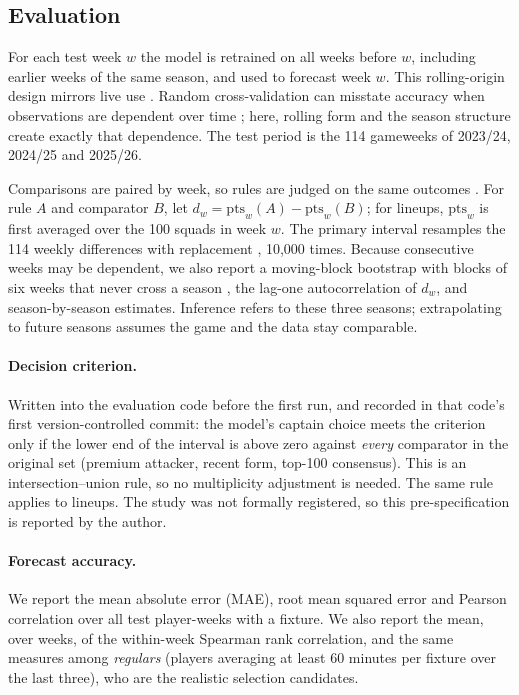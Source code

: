 \documentclass[11pt,a4paper]{article}
\begin{document}
\subsection{Evaluation}
For each test week $w$ the model is retrained on all weeks before $w$, including earlier weeks of
the same season, and used to forecast week $w$. This rolling-origin design mirrors live use
\citep{tashman2000}. Random cross-validation can misstate accuracy when observations are
dependent over time \citep{bergmeir2012}; here, rolling form and the season structure create
exactly that dependence. The test period is the 114 gameweeks of 2023/24, 2024/25 and 2025/26.

Comparisons are paired by week, so rules are judged on the same outcomes
\citep{dieboldmariano1995}. For rule $A$ and comparator $B$, let
$d_w=\mathrm{pts}_w(A)-\mathrm{pts}_w(B)$; for lineups, $\mathrm{pts}_w$ is first averaged over the 100
squads in week $w$. The primary interval resamples the 114 weekly differences with replacement
\citep{efron1993}, 10{,}000 times. Because consecutive weeks may be dependent, we also report a
moving-block bootstrap with blocks of six weeks that never cross a season
\citep{kunsch1989,politis1994}, the lag-one autocorrelation of $d_w$, and season-by-season
estimates. Inference refers to these three seasons; extrapolating to future seasons assumes the
game and the data stay comparable.

\paragraph{Decision criterion.} Written into the evaluation code before the first run, and
recorded in that code's first version-controlled commit: the model's captain choice meets the
criterion only if the lower end of the interval is above zero against \emph{every} comparator in
the original set (premium attacker, recent form, top-100 consensus). This is an
intersection--union rule, so no multiplicity adjustment is needed. The same rule applies to
lineups. The study was not formally registered, so this pre-specification is reported by the
author.

\paragraph{Forecast accuracy.} We report the mean absolute error (MAE), root mean squared error and
Pearson correlation over all test player-weeks with a fixture. We also report the mean, over
weeks, of the within-week Spearman rank correlation, and the same measures among \emph{regulars}
(players averaging at least 60 minutes per fixture over the last three), who are the realistic
selection candidates.
\end{document}
